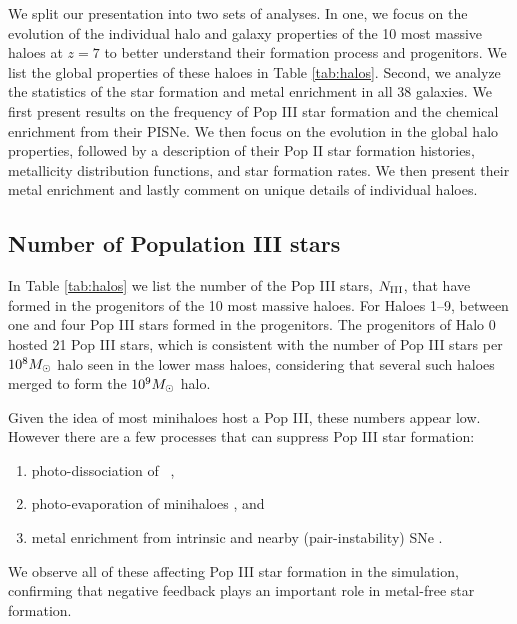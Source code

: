 \documentclass[useAMS,usenatbib]{mn2e}
\begin{document}

We split our presentation into two sets of analyses.  In one, we focus
on the evolution of the individual halo and galaxy properties of the
10 most massive haloes at $z=7$ to better understand their formation
process and progenitors.  We list the global properties of these
haloes in Table \ref{tab:halos}.  Second, we analyze the statistics of
the star formation and metal enrichment in all 38 galaxies.  We first
present results on the frequency of Pop III star formation and the
chemical enrichment from their PISNe.  We then focus on the evolution
in the global halo properties, followed by a description of their Pop
II star formation histories, metallicity distribution functions, and
star formation rates.  We then present their metal enrichment and
lastly comment on unique details of individual haloes.

\subsection{Number of Population III stars}

In Table \ref{tab:halos} we list the number of the Pop III stars,
$N_{\rm III}$, that have formed in the progenitors of the 10 most
massive haloes.  For Haloes 1--9, between one and four Pop III stars
formed in the progenitors.  The progenitors of Halo 0 hosted 21 Pop
III stars, which is consistent with the number of Pop III stars per
$10^8 \Ms$ halo seen in the lower mass haloes, considering that
several such haloes merged to form the $10^9 \Ms$ halo.

Given the idea of most minihaloes host a Pop III, these numbers appear
low.  However there are a few processes that can suppress Pop III star
formation:
%
\begin{enumerate}
\item photo-dissociation of \hh~\citep{Dekel87, Haiman00, Machacek01},
\item photo-evaporation of minihaloes \citep{Shapiro04, whalen08}, and
\item metal enrichment from intrinsic and nearby (pair-instability)
  SNe \citep{Wise08_Gal, Trenti09, Greif10}.
\end{enumerate}
We observe all of these affecting Pop III star formation in the
simulation, confirming that negative feedback plays an important role
in metal-free star formation.
\end{document}
